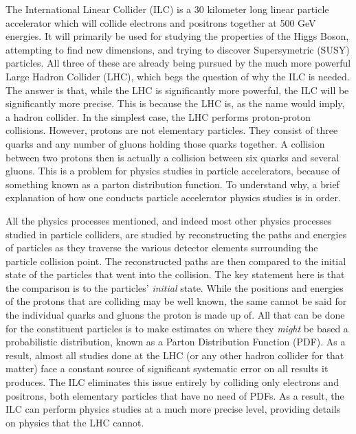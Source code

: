 \documentclass{report}
\begin{document}
                The International Linear Collider (ILC) is a 30 kilometer long \cite{parton} linear particle accelerator \cite{specs} which will collide electrons and positrons together at 500 GeV energies. It will primarily be used for studying the properties of the Higgs Boson, attempting to find new dimensions, and trying to discover Supersymetric (SUSY) particles. All three of these are already being pursued by the much more powerful Large Hadron Collider (LHC), which begs the question of why the ILC is needed. The answer is that, while the LHC is significantly more powerful, the ILC will be significantly more precise. This is because the LHC is, as the name would imply, a hadron collider. In the simplest case, the LHC performs proton-proton collisions. However, protons are not elementary particles. They consist of three quarks and any number of gluons holding those quarks together. A collision between two protons then is actually a collision between six quarks and several gluons. This is a problem for physics studies in particle accelerators, because of something known as a parton distribution function. To understand why, a brief explanation of how one conducts particle accelerator physics studies is in order.

                All the physics processes mentioned, and indeed most other physics processes studied in particle colliders, are studied by reconstructing the paths and energies of particles as they traverse the various detector elements surrounding the particle collision point. The reconstructed paths are then compared to the initial state of the particles that went into the collision. The key statement here is that the comparison is to the particles' \textit{initial} state. While the positions and energies of the protons that are colliding may be well known, the same cannot be said for the individual quarks and gluons the proton is made up of. All that can be done for the constituent particles is to make estimates on where they \textit{might} be based a probabilistic distribution, known as a Parton Distribution Function (PDF). As a result, almost all studies done at the LHC (or any other hadron collider for that matter) face a constant source of significant systematic error on all results it produces. The ILC eliminates this issue entirely by colliding only electrons and positrons, both elementary particles that have no need of PDFs. As a result, the ILC can perform physics studies at a much more precise level, providing details on physics that the LHC cannot.

\end{document}
